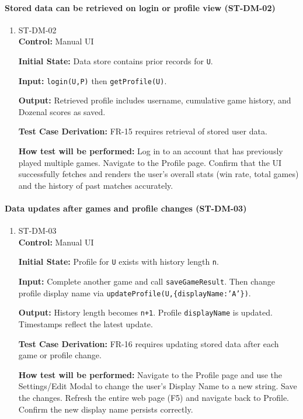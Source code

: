 \documentclass[12pt, titlepage]{article}
\begin{document}
\paragraph{Stored data can be retrieved on login or profile view (ST-DM-02)}
\begin{enumerate}
\item{ST-DM-02\\}
\textbf{Control:} Manual UI

\textbf{Initial State:} Data store contains prior records for \texttt{U}.

\textbf{Input:} \texttt{login(U,P)} then \texttt{getProfile(U)}.

\textbf{Output:} Retrieved profile includes username, cumulative game history, and Dozenal scores as saved.

\textbf{Test Case Derivation:} FR-15 requires retrieval of stored user data.

\textbf{How test will be performed:} Log in to an account that has previously played multiple games. Navigate to the Profile page. Confirm that the UI successfully fetches and renders the user's overall stats (win rate, total games) and the history of past matches accurately.
\end{enumerate}

\paragraph{Data updates after games and profile changes (ST-DM-03)}
\begin{enumerate}
\item{ST-DM-03\\}
\textbf{Control:} Manual UI

\textbf{Initial State:} Profile for \texttt{U} exists with history length \texttt{n}.

\textbf{Input:} Complete another game and call \texttt{saveGameResult}. Then change profile display name via \texttt{updateProfile(U,\{displayName:'A'\})}.

\textbf{Output:} History length becomes \texttt{n+1}. Profile \texttt{displayName} is updated. Timestamps reflect the latest update.

\textbf{Test Case Derivation:} FR-16 requires updating stored data after each game or profile change.

\textbf{How test will be performed:} Navigate to the Profile page and use the Settings/Edit Modal to change the user's Display Name to a new string. Save the changes. Refresh the entire web page (F5) and navigate back to Profile. Confirm the new display name persists correctly.
\end{enumerate}
\end{document}
